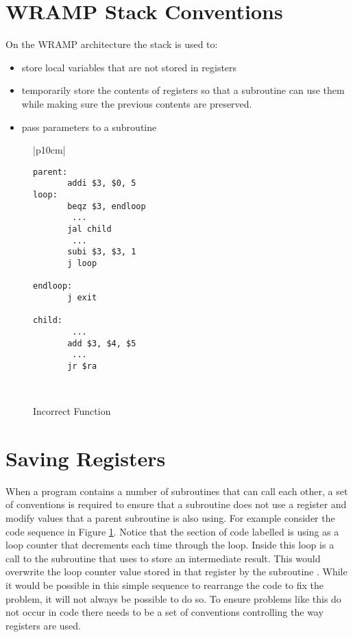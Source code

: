 \section{WRAMP Stack Conventions}
On the WRAMP architecture the stack is used to:

\begin{itemize}
\item store local variables that are not stored in registers
\item temporarily store the contents of registers so that a subroutine can use them while making sure the previous contents are preserved.
\item pass parameters to a subroutine
\end{itemize}

%
%
\begin{figure}[!hbt]
\begin{footnotesize}
\begin{center}
\begin{tabular}{|p{10cm}|}
\hline
\begin{verbatim}
parent:
       addi $3, $0, 5
loop:
       beqz $3, endloop
        ...
       jal child
        ...
       subi $3, $3, 1
       j loop

endloop:
       j exit

child:
        ...
       add $3, $4, $5
        ...
       jr $ra
\end{verbatim}
\\
\hline
\end{tabular}
\end{center}
\end{footnotesize}
\caption{Incorrect Function} 
\label{fig:problemcode}
\end{figure}

\section{Saving Registers}
When a program contains a number of subroutines that can call each
other, a set of conventions is required to ensure that a subroutine
does not use a register and modify values that a parent subroutine is
also using. For example consider the code sequence in Figure
\ref{fig:problemcode}. Notice that the section of code labelled
 is using  as a loop counter that decrements each
time through the loop. Inside this loop is a call to the subroutine
 that uses  to store an intermediate result. This
would overwrite the loop counter value stored in that register by the
subroutine . While it would be possible in this simple
sequence to rearrange the code to fix the problem, it will not always
be possible to do so. To ensure problems like this do not occur in
code there needs to be a set of conventions controlling the way
registers are used.

